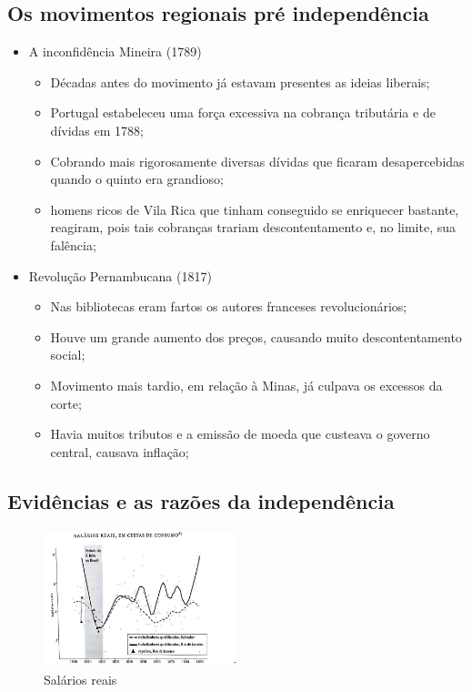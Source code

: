 \documentclass[a4paper,12pt]{article}[abntex2]
\begin{document}
\subsection{\textbf{Os movimentos regionais pré independência}}
\begin{itemize}
    \item A inconfidência Mineira (1789)
    \begin{itemize}
        \item Décadas antes do movimento já estavam presentes as ideias
liberais;
\item Portugal estabeleceu uma força excessiva na cobrança tributária e
de dívidas em 1788;
\item Cobrando mais rigorosamente diversas dívidas que ficaram
desapercebidas quando o quinto era grandioso;
\item homens ricos de Vila Rica que tinham conseguido se enriquecer bastante, reagiram, pois tais cobranças trariam descontentamento e, no limite, sua falência;

    \end{itemize}
    \item Revolução Pernambucana (1817)
    \begin{itemize}
        \item Nas bibliotecas eram fartos os autores franceses revolucionários;
        \item Houve um grande aumento dos preços, causando muito descontentamento social;
\item Movimento mais tardio, em relação à Minas, já culpava os
excessos da corte;
\item Havia muitos tributos e a emissão de moeda que custeava o governo central, causava inflação;
    \end{itemize}
\end{itemize}
\subsection{\textbf{Evidências e as razões da independência}}

\begin{figure}[H]
    \centering
    \includegraphics[width=0.5\textwidth]{Imagens Slides/i2a5.png}
    \caption{Salários reais}
\end{figure}
\end{document}
